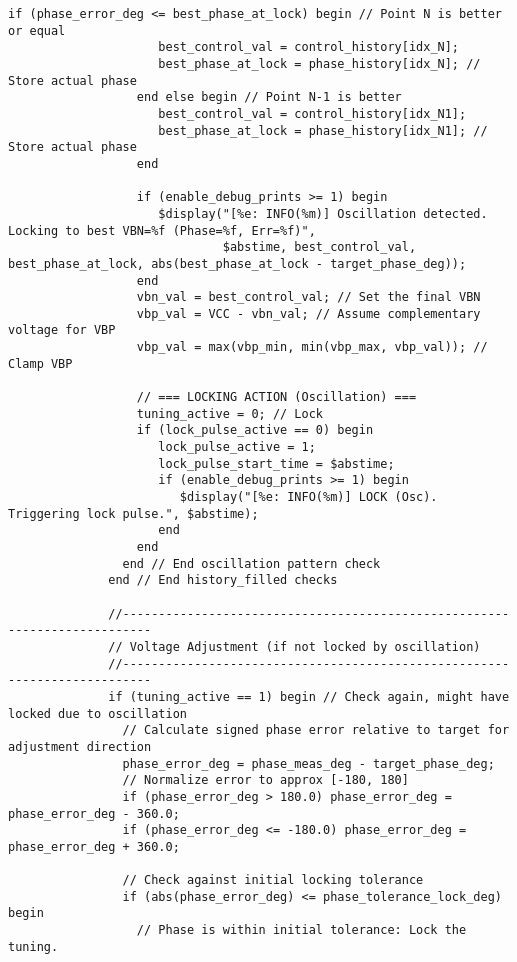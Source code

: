 \begin{lstlisting}[caption={Verilog-A Generic Vb Tuner Implementation}]
                  if (phase_error_deg <= best_phase_at_lock) begin // Point N is better or equal
                     best_control_val = control_history[idx_N];
                     best_phase_at_lock = phase_history[idx_N]; // Store actual phase
                  end else begin // Point N-1 is better
                     best_control_val = control_history[idx_N1];
                     best_phase_at_lock = phase_history[idx_N1]; // Store actual phase
                  end

                  if (enable_debug_prints >= 1) begin
                     $display("[%e: INFO(%m)] Oscillation detected. Locking to best VBN=%f (Phase=%f, Err=%f)",
                              $abstime, best_control_val, best_phase_at_lock, abs(best_phase_at_lock - target_phase_deg));
                  end
                  vbn_val = best_control_val; // Set the final VBN
                  vbp_val = VCC - vbn_val; // Assume complementary voltage for VBP
                  vbp_val = max(vbp_min, min(vbp_max, vbp_val)); // Clamp VBP

                  // === LOCKING ACTION (Oscillation) ===
                  tuning_active = 0; // Lock
                  if (lock_pulse_active == 0) begin
                     lock_pulse_active = 1;
                     lock_pulse_start_time = $abstime;
                     if (enable_debug_prints >= 1) begin
                        $display("[%e: INFO(%m)] LOCK (Osc). Triggering lock pulse.", $abstime);
                     end
                  end
                end // End oscillation pattern check
              end // End history_filled checks

              //--------------------------------------------------------------------------
              // Voltage Adjustment (if not locked by oscillation)
              //--------------------------------------------------------------------------
              if (tuning_active == 1) begin // Check again, might have locked due to oscillation
                // Calculate signed phase error relative to target for adjustment direction
                phase_error_deg = phase_meas_deg - target_phase_deg;
                // Normalize error to approx [-180, 180]
                if (phase_error_deg > 180.0) phase_error_deg = phase_error_deg - 360.0;
                if (phase_error_deg <= -180.0) phase_error_deg = phase_error_deg + 360.0;

                // Check against initial locking tolerance
                if (abs(phase_error_deg) <= phase_tolerance_lock_deg) begin
                  // Phase is within initial tolerance: Lock the tuning.


\end{lstlisting}
